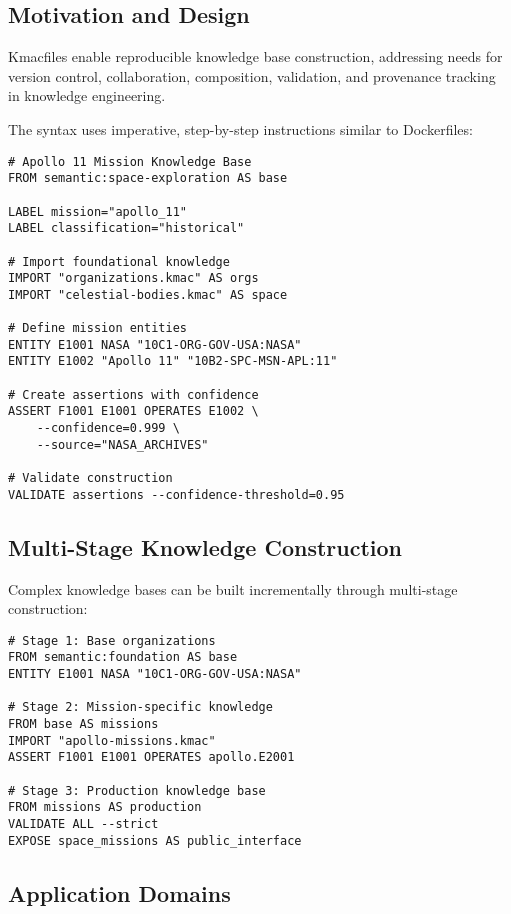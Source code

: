\documentclass[conference]{IEEEtran}
\begin{document}
\subsection{Motivation and Design}

Kmacfiles enable reproducible knowledge base construction, addressing needs for version control, collaboration, composition, validation, and provenance tracking in knowledge engineering.

The syntax uses imperative, step-by-step instructions similar to Dockerfiles:

\begin{lstlisting}[caption=Basic Kmacfile Structure]
# Apollo 11 Mission Knowledge Base
FROM semantic:space-exploration AS base

LABEL mission="apollo_11"
LABEL classification="historical"

# Import foundational knowledge
IMPORT "organizations.kmac" AS orgs
IMPORT "celestial-bodies.kmac" AS space

# Define mission entities
ENTITY E1001 NASA "10C1-ORG-GOV-USA:NASA"
ENTITY E1002 "Apollo 11" "10B2-SPC-MSN-APL:11"

# Create assertions with confidence
ASSERT F1001 E1001 OPERATES E1002 \
    --confidence=0.999 \
    --source="NASA_ARCHIVES"

# Validate construction
VALIDATE assertions --confidence-threshold=0.95
\end{lstlisting}

\subsection{Multi-Stage Knowledge Construction}

Complex knowledge bases can be built incrementally through multi-stage construction:

\begin{lstlisting}[caption=Multi-Stage Kmacfile]
# Stage 1: Base organizations
FROM semantic:foundation AS base
ENTITY E1001 NASA "10C1-ORG-GOV-USA:NASA"

# Stage 2: Mission-specific knowledge  
FROM base AS missions
IMPORT "apollo-missions.kmac"
ASSERT F1001 E1001 OPERATES apollo.E2001

# Stage 3: Production knowledge base
FROM missions AS production
VALIDATE ALL --strict
EXPOSE space_missions AS public_interface
\end{lstlisting}

\subsection{Application Domains}
\end{document}
